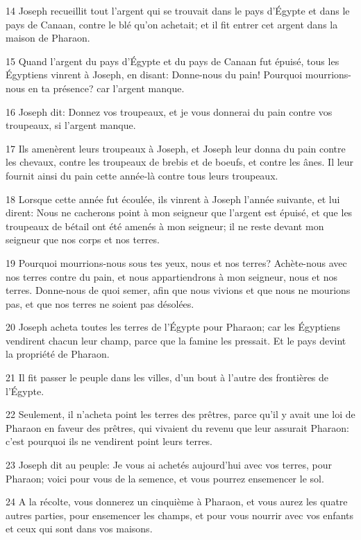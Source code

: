 \par 14 Joseph recueillit tout l'argent qui se trouvait dans le pays d'Égypte et dans le pays de Canaan, contre le blé qu'on achetait; et il fit entrer cet argent dans la maison de Pharaon.
\par 15 Quand l'argent du pays d'Égypte et du pays de Canaan fut épuisé, tous les Égyptiens vinrent à Joseph, en disant: Donne-nous du pain! Pourquoi mourrions-nous en ta présence? car l'argent manque.
\par 16 Joseph dit: Donnez vos troupeaux, et je vous donnerai du pain contre vos troupeaux, si l'argent manque.
\par 17 Ils amenèrent leurs troupeaux à Joseph, et Joseph leur donna du pain contre les chevaux, contre les troupeaux de brebis et de boeufs, et contre les ânes. Il leur fournit ainsi du pain cette année-là contre tous leurs troupeaux.
\par 18 Lorsque cette année fut écoulée, ils vinrent à Joseph l'année suivante, et lui dirent: Nous ne cacherons point à mon seigneur que l'argent est épuisé, et que les troupeaux de bétail ont été amenés à mon seigneur; il ne reste devant mon seigneur que nos corps et nos terres.
\par 19 Pourquoi mourrions-nous sous tes yeux, nous et nos terres? Achète-nous avec nos terres contre du pain, et nous appartiendrons à mon seigneur, nous et nos terres. Donne-nous de quoi semer, afin que nous vivions et que nous ne mourions pas, et que nos terres ne soient pas désolées.
\par 20 Joseph acheta toutes les terres de l'Égypte pour Pharaon; car les Égyptiens vendirent chacun leur champ, parce que la famine les pressait. Et le pays devint la propriété de Pharaon.
\par 21 Il fit passer le peuple dans les villes, d'un bout à l'autre des frontières de l'Égypte.
\par 22 Seulement, il n'acheta point les terres des prêtres, parce qu'il y avait une loi de Pharaon en faveur des prêtres, qui vivaient du revenu que leur assurait Pharaon: c'est pourquoi ils ne vendirent point leurs terres.
\par 23 Joseph dit au peuple: Je vous ai achetés aujourd'hui avec vos terres, pour Pharaon; voici pour vous de la semence, et vous pourrez ensemencer le sol.
\par 24 A la récolte, vous donnerez un cinquième à Pharaon, et vous aurez les quatre autres parties, pour ensemencer les champs, et pour vous nourrir avec vos enfants et ceux qui sont dans vos maisons.
